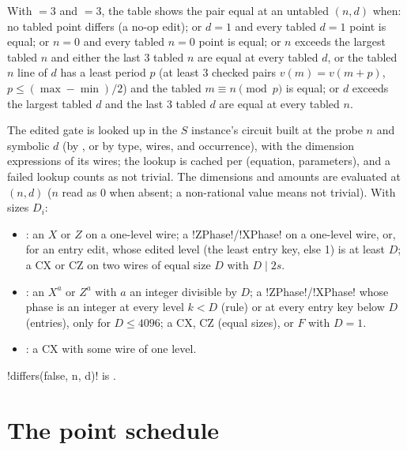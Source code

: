 \begin{algorithm}\label{alg:bench-table-equal}
With  $=3$ and  $=3$, the table shows the pair equal at an untabled
$(n,d)$ when: no tabled point differs (a no-op edit); or $d=1$ and every tabled $d=1$ point is
equal; or $n=0$ and every tabled $n=0$ point is equal; or $n$ exceeds the largest tabled $n$ and
either the last 3 tabled $n$ are equal at every tabled $d$, or the tabled $n$ line of $d$ has a
least period $p$ (at least 3 checked pairs $v(m) = v(m+p)$, $p\le(\max-\min)/2$) and the tabled
$m\equiv n \pmod p$ is equal; or $d$ exceeds the largest tabled $d$ and the last 3 tabled $d$ are
equal at every tabled $n$.
\end{algorithm}

\begin{algorithm}\label{alg:bench-gate-trivial}
The edited gate is looked up in the $S$ instance's circuit built at the probe $n$ and symbolic
$d$ (by , or by type, wires, and occurrence), with the dimension expressions of its
wires; the lookup is cached per (equation, parameters), and a failed lookup counts as not
trivial. The dimensions and amounts are evaluated at $(n,d)$ ($n$ read as 0 when absent; a
non-rational value means not trivial). With sizes $D_i$:
\begin{itemize}
\item {}: an $X$ or $Z$ on a one-level wire; a \py!ZPhase!/\py!XPhase! on a
  one-level wire, or, for an entry edit, whose edited level (the least entry key, else 1) is at
  least $D$; a CX or CZ on two wires of equal size $D$ with $D \mid 2s$.
\item {}: an $X^a$ or $Z^a$ with $a$ an integer divisible by $D$; a
  \py!ZPhase!/\py!XPhase! whose phase is an integer at every level $k<D$ (rule) or at every entry
  key below $D$ (entries), only for $D\le4096$; a CX, CZ (equal sizes), or $F$ with $D=1$.
\item {}: a CX with some wire of one level.
\end{itemize}
\end{algorithm}

\py!differs(false, n, d)! is .

\section{The point schedule}\label{sec:bench-points}

